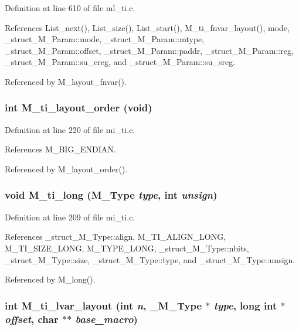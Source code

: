Definition at line 610 of file ml\_\-ti.c.

References List\_\-next(), List\_\-size(), List\_\-start(), M\_\-ti\_\-fnvar\_\-layout(), mode, \_\-struct\_\-M\_\-Param::mode, \_\-struct\_\-M\_\-Param::mtype, \_\-struct\_\-M\_\-Param::offset, \_\-struct\_\-M\_\-Param::paddr, \_\-struct\_\-M\_\-Param::reg, \_\-struct\_\-M\_\-Param::su\_\-ereg, and \_\-struct\_\-M\_\-Param::su\_\-sreg.

Referenced by M\_\-layout\_\-fnvar().
\subsubsection{\setlength{\rightskip}{0pt plus 5cm}int M\_\-ti\_\-layout\_\-order (void)}\label{m__ti_8h_a57839734123745b85f3ba32ff1ddf45}




Definition at line 220 of file mi\_\-ti.c.

References M\_\-BIG\_\-ENDIAN.

Referenced by M\_\-layout\_\-order().
\subsubsection{\setlength{\rightskip}{0pt plus 5cm}void M\_\-ti\_\-long (\bf{M\_\-Type} {\em type}, int {\em unsign})}\label{m__ti_8h_d774fbbacbac4d176ffb594448574cc8}




Definition at line 209 of file mi\_\-ti.c.

References \_\-struct\_\-M\_\-Type::align, M\_\-TI\_\-ALIGN\_\-LONG, M\_\-TI\_\-SIZE\_\-LONG, M\_\-TYPE\_\-LONG, \_\-struct\_\-M\_\-Type::nbits, \_\-struct\_\-M\_\-Type::size, \_\-struct\_\-M\_\-Type::type, and \_\-struct\_\-M\_\-Type::unsign.

Referenced by M\_\-long().
\subsubsection{\setlength{\rightskip}{0pt plus 5cm}int M\_\-ti\_\-lvar\_\-layout (int {\em n}, \bf{\_\-M\_\-Type} $\ast$ {\em type}, long int $\ast$ {\em offset}, char $\ast$$\ast$ {\em base\_\-macro})}\label{m__ti_8h_a3bd1781085ae8ea0268ab3c00949cfc}




